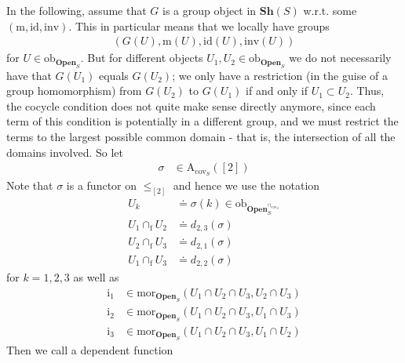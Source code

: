 \begin{exa}
\label{exa:gs3}
In the following, assume that $G$ is a group object in $\mathbf{Sh}(S)$ w.r.t. some $(\mathrm{m},\mathrm{id},\mathrm{inv})$.
This in particular means that we locally have groups
\begin{align*}
  \left(
    G(U),
    \mathrm{m}(U),
    \mathrm{id}(U),
    \mathrm{inv}(U)
  \right)
\end{align*}
for $U \in \mathrm{ob}_{\mathbf{Open}_{S}}$.
But for different objects $U_{1},U_{2} \in \mathrm{ob}_{\mathbf{Open}_{S}}$ we do not necessarily have that $G(U_{1})$ equals $G(U_{2})$; we only have a restriction (in the guise of a group homomorphism) from $G(U_{2})$ to $G(U_{1})$ if and only if $U_{1} \subset U_{2}$.
Thus, the cocycle condition does not quite make sense directly anymore, since each term of this condition is potentially in a different group, and we must restrict the terms to the largest possible common domain - that is, the intersection of all the domains involved.
So let
\begin{align*}
  \sigma
  &\in
  \mathrm{A}_{\mathrm{cov}_{S}}([2])
\end{align*}
Note that $\sigma$ is a functor on $\pmb{\leq}_{[2]}$ and hence we use the notation
\begin{align*}
  U_{k}
  &\doteq
  \sigma(k)
  \in
  \mathrm{ob}_{\mathbf{Open}_{S}^{\cap_{\mathrm{cov}_{S}}}}
  \\
  U_{1}
  \cap_{\textrm{f}}
  U_{2}
  &\doteq
  d_{2,3}(\sigma)
  \\
  U_{2}
  \cap_{\textrm{f}}
  U_{3}
  &\doteq
  d_{2,1}(\sigma)
  \\
  U_{1}
  \cap_{\textrm{f}}
  U_{3}
  &\doteq
  d_{2,2}(\sigma)
\end{align*}
for $k = 1,2,3$ as well as
\begin{align*}
  \mathrm{i}_{1}
  &\in
  \mathrm{mor}_{\mathbf{Open}_{S}}
  \left(
    U_{1}
    \cap
    U_{2}
    \cap
    U_{3},
    U_{2}
    \cap
    U_{3}
  \right)
  \\
  \mathrm{i}_{2}
  &\in
  \mathrm{mor}_{\mathbf{Open}_{S}}
  \left(
    U_{1}
    \cap
    U_{2}
    \cap
    U_{3},
    U_{1}
    \cap
    U_{3}
  \right)
  \\
  \mathrm{i}_{3}
  &\in
  \mathrm{mor}_{\mathbf{Open}_{S}}
  \left(
    U_{1}
    \cap
    U_{2}
    \cap
    U_{3},
    U_{1}
    \cap
    U_{2}
  \right)
\end{align*}
Then we call a dependent function
\begin{align*}

\end{align*}
\end{exa}
